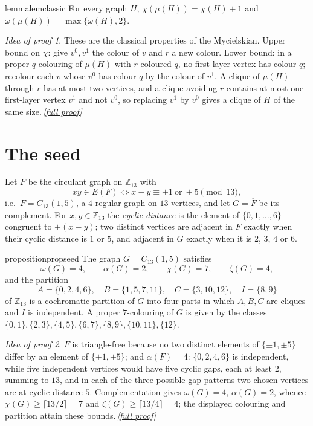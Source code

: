\documentclass[11pt,a4paper]{article}
\theoremstyle{plain}
\theoremstyle{definition}
\theoremstyle{remark}
\newtheorem*{proofidea}{Idea of proof}
\newcommand{\fullproofref}[1]{\,\hyperref[#1]{\textit{[full proof]}}}
\newcommand{\Z}{\mathbb Z}
\newcommand{\myc}{\mu}
\newcommand{\Fb}{\overline F}
\begin{document}
\begin{restatable}{lemma}{lemclassic}\label{lem:classic}
For every graph $H$, $\chi(\myc(H))=\chi(H)+1$ and $\omega(\myc(H))=\max\{\omega(H),2\}$.
\end{restatable}
\begin{proofidea}
These are the classical properties of the Mycielskian. Upper bound on $\chi$: give $v^0,v^1$ the colour of $v$ and $r$ a new colour. Lower bound: in a proper $q$-colouring of $\myc(H)$ with $r$ coloured $q$, no first-layer vertex has colour $q$; recolour each $v$ whose $v^0$ has colour $q$ by the colour of $v^1$. A clique of $\myc(H)$ through $r$ has at most two vertices, and a clique avoiding $r$ contains at most one first-layer vertex $v^1$ and not $v^0$, so replacing $v^1$ by $v^0$ gives a clique of $H$ of the same size.\fullproofref{pf:classic}
\end{proofidea}

\section{The seed}\label{sec:seed}

Let $F$ be the circulant graph on $\Z_{13}$ with
\[
xy\in E(F)\iff x-y\equiv\pm1\ \text{or}\ \pm5\pmod{13},
\]
i.e.\ $F=C_{13}(1,5)$, a $4$-regular graph on $13$ vertices, and let $G=\Fb$ be its complement. For $x,y\in\Z_{13}$ the \emph{cyclic distance} is the element of $\{0,1,\dots,6\}$ congruent to $\pm(x-y)$; two distinct vertices are adjacent in $F$ exactly when their cyclic distance is $1$ or $5$, and adjacent in $G$ exactly when it is $2$, $3$, $4$ or $6$.

\begin{restatable}{proposition}{propseed}\label{prop:seed}
The graph $G=\overline{C_{13}(1,5)}$ satisfies
\[
\omega(G)=4,\qquad\alpha(G)=2,\qquad\chi(G)=7,\qquad\zeta(G)=4,
\]
and the partition
\[
A=\{0,2,4,6\},\quad B=\{1,5,7,11\},\quad C=\{3,10,12\},\quad I=\{8,9\}
\]
of $\Z_{13}$ is a cochromatic partition of $G$ into four parts in which $A,B,C$ are cliques and $I$ is independent. A proper $7$-colouring of $G$ is given by the classes $\{0,1\},\{2,3\},\{4,5\},\{6,7\},\{8,9\},\{10,11\},\{12\}$.
\end{restatable}
\begin{proofidea}
$F$ is triangle-free because no two distinct elements of $\{\pm1,\pm5\}$ differ by an element of $\{\pm1,\pm5\}$; and $\alpha(F)=4$: $\{0,2,4,6\}$ is independent, while five independent vertices would have five cyclic gaps, each at least $2$, summing to $13$, and in each of the three possible gap patterns two chosen vertices are at cyclic distance $5$. Complementation gives $\omega(G)=4$, $\alpha(G)=2$, whence $\chi(G)\ge\lceil13/2\rceil=7$ and $\zeta(G)\ge\lceil13/4\rceil=4$; the displayed colouring and partition attain these bounds.\fullproofref{pf:seed}
\end{proofidea}
\end{document}
